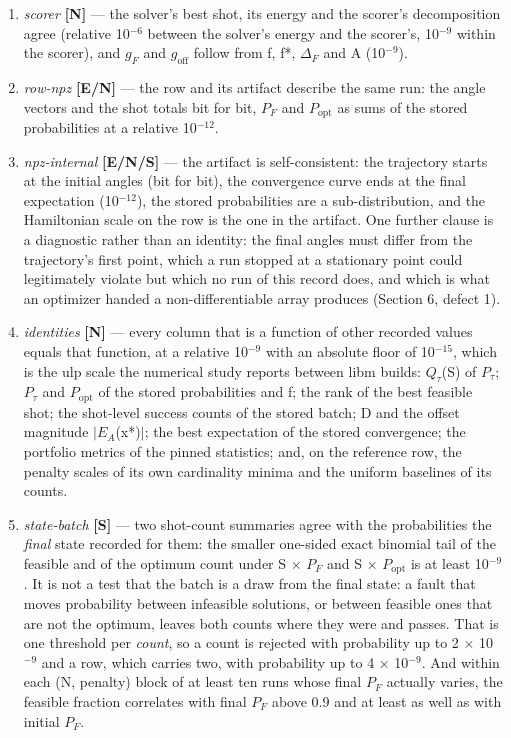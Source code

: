 \documentclass[acmsmall,screen,review]{acmart}
\begin{document}
\begin{enumerate}
\item \textit{scorer} \textbf{[N]} --- the solver's best shot, its energy and the scorer's decomposition agree (relative 10$^{-6}$ between the solver's energy and the scorer's, 10$^{-9}$ within the scorer), and $g_{F}$ and $g_{\mathrm{off}}$ follow from f, f*, $\Delta_{F}$ and A (10$^{-9}$).
\item \textit{row-npz} \textbf{[E/N]} --- the row and its artifact describe the same run: the angle vectors and the shot totals bit for bit, $P_{F}$ and $P_{\mathrm{opt}}$ as sums of the stored probabilities at a relative 10$^{-12}$.
\item \textit{npz-internal} \textbf{[E/N/S]} --- the artifact is self-consistent: the trajectory starts at the initial angles (bit for bit), the convergence curve ends at the final expectation (10$^{-12}$), the stored probabilities are a sub-distribution, and the Hamiltonian scale on the row is the one in the artifact. One further clause is a diagnostic rather than an identity: the final angles must differ from the trajectory's first point, which a run stopped at a stationary point could legitimately violate but which no run of this record does, and which is what an optimizer handed a non-differentiable array produces (Section 6, defect 1).
\item \textit{identities} \textbf{[N]} --- every column that is a function of other recorded values equals that function, at a relative 10$^{-9}$ with an absolute floor of 10$^{-15}$, which is the ulp scale the numerical study reports between libm builds: $Q_{\tau}$(S) of $P_{\tau}$; $P_{\tau}$ and $P_{\mathrm{opt}}$ of the stored probabilities and f; the rank of the best feasible shot; the shot-level success counts of the stored batch; D and the offset magnitude $|$$E_{A}$(x*)$|$; the best expectation of the stored convergence; the portfolio metrics of the pinned statistics; and, on the reference row, the penalty scales of its own cardinality minima and the uniform baselines of its counts.
\item \textit{state-batch} \textbf{[S]} --- two shot-count summaries agree with the probabilities the \textit{final} state recorded for them: the smaller one-sided exact binomial tail of the feasible and of the optimum count under S $\times$ $P_{F}$ and S $\times$ $P_{\mathrm{opt}}$ is at least 10$^{-9}$. It is not a test that the batch is a draw from the final state: a fault that moves probability between infeasible solutions, or between feasible ones that are not the optimum, leaves both counts where they were and passes. That is one threshold per \textit{count}, so a count is rejected with probability up to 2 $\times$ 10$^{-9}$ and a row, which carries two, with probability up to 4 $\times$ 10$^{-9}$. And within each (N, penalty) block of at least ten runs whose final $P_{F}$ actually varies, the feasible fraction correlates with final $P_{F}$ above 0.9 and at least as well as with initial $P_{F}$.
$$
\end{enumerate}
\end{document}
